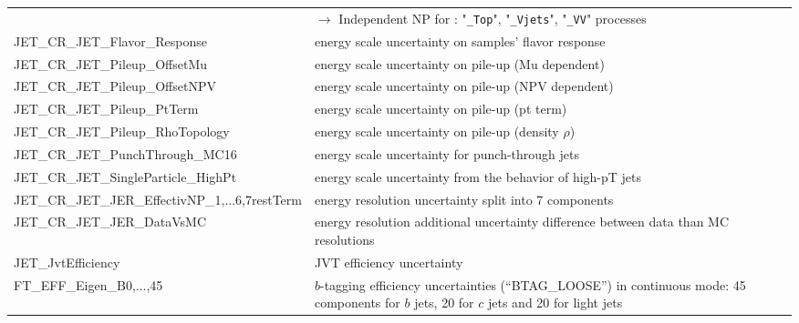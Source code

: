 \begin{table}
{\begin{tabular}{ll}
                                  & {$\rightarrow$ Independent NP for : "\texttt{\_Top}", "\texttt{\_Vjets}", "\texttt{\_VV}" processes } \\
JET\_CR\_JET\_Flavor\_Response & energy scale uncertainty on samples' flavor response \\%
JET\_CR\_JET\_Pileup\_OffsetMu & energy scale uncertainty on pile-up (Mu dependent) \\%
JET\_CR\_JET\_Pileup\_OffsetNPV & energy scale uncertainty on pile-up (NPV dependent) \\%
JET\_CR\_JET\_Pileup\_PtTerm & energy scale uncertainty on pile-up (pt term) \\%
JET\_CR\_JET\_Pileup\_RhoTopology & energy scale uncertainty on pile-up (density $\rho$) \\%
JET\_CR\_JET\_PunchThrough\_MC16 & energy scale uncertainty for punch-through jets \\%
JET\_CR\_JET\_SingleParticle\_HighPt & energy scale uncertainty from the behavior of high-pT jets \\%
JET\_CR\_JET\_JER\_EffectivNP\_1,...6,7restTerm & energy resolution uncertainty split into 7 components \\%
JET\_CR\_JET\_JER\_DataVsMC & energy resolution additional uncertainty difference between data than MC resolutions \\%
JET\_JvtEfficiency & JVT efficiency uncertainty \\%
FT\_EFF\_Eigen\_B0,...,45 & \multirow{3}{*}{\parbox{11cm}{$b$-tagging efficiency uncertainties (``BTAG\_LOOSE'') in continuous mode: 45 components for $b$ jets, 20 for $c$ jets and 20 for light jets}} \\%

\end{tabular}}
\end{table}
